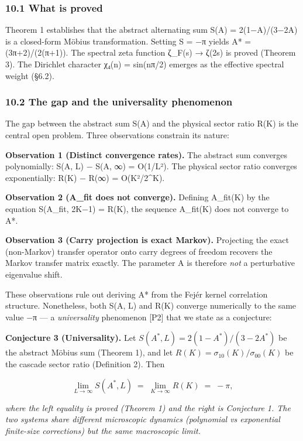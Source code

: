 \documentclass[
  11pt,
]{article}
\begin{document}
\subsubsection{10.1 What is proved}\label{what-is-proved}

Theorem 1 establishes that the abstract alternating sum S(A) = 2(1−A)/(3−2A) is
a closed-form Möbius transformation. Setting S = −π yields A* = (3π+2)/(2(π+1)).
The spectral zeta function ζ\_F(s) → ζ(2s) is proved (Theorem 3). The Dirichlet
character χ₄(n) = sin(nπ/2) emerges as the effective spectral weight (§6.2).

\subsubsection{10.2 The gap and the universality
phenomenon}\label{the-gap-and-the-universality-phenomenon}

The gap between the abstract sum S(A) and the physical sector ratio R(K) is the
central open problem. Three observations constrain its nature:

\textbf{Observation 1 (Distinct convergence rates).} The abstract sum converges
polynomially: S(A, L) − S(A, ∞) = O(1/L²). The physical sector ratio converges
exponentially: R(K) − R(∞) = O(K²/2\^{}K).

\textbf{Observation 2 (A\_fit does not converge).} Defining A\_fit(K) by the
equation S(A\_fit, 2K−1) = R(K), the sequence A\_fit(K) does not converge to A*.

\textbf{Observation 3 (Carry projection is exact Markov).} Projecting the exact
(non-Markov) transfer operator onto carry degrees of freedom recovers the Markov
transfer matrix exactly. The parameter A is therefore \emph{not} a perturbative
eigenvalue shift.

These observations rule out deriving A* from the Fejér kernel correlation
structure. Nonetheless, both S(A, L) and R(K) converge numerically to the same
value −π --- a \emph{universality} phenomenon {[}P2{]} that we state as a
conjecture:

\textbf{Conjecture 3 (Universality).} Let
\(S(A^{\ast}, L) = 2(1-A^{\ast})/(3-2A^{\ast})\) be the abstract Möbius sum
(Theorem 1), and let \(R(K) = \sigma_{10}(K)/\sigma_{00}(K)\) be the cascade
sector ratio (Definition 2). Then

\[\lim_{L \to \infty} S(A^{\ast}, L) \;=\; \lim_{K \to \infty} R(K) \;=\; -\pi,\]

\emph{where the left equality is proved (Theorem 1) and the right is Conjecture
1. The two systems share different microscopic dynamics (polynomial vs
exponential finite-size corrections) but the same macroscopic limit.}
\end{document}
